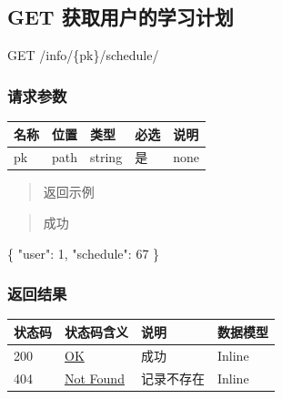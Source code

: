 \documentclass[
]{article}
\newenvironment{Shaded}{}{}
\newcommand{\DataTypeTok}[1]{\textcolor[rgb]{0.56,0.13,0.00}{#1}}
\newcommand{\DecValTok}[1]{\textcolor[rgb]{0.25,0.63,0.44}{#1}}
\newcommand{\FunctionTok}[1]{\textcolor[rgb]{0.02,0.16,0.49}{#1}}
\begin{document}
\hypertarget{get-ux83b7ux53d6ux7528ux6237ux7684ux5b66ux4e60ux8ba1ux5212}{%
\subsection{GET
获取用户的学习计划}\label{get-ux83b7ux53d6ux7528ux6237ux7684ux5b66ux4e60ux8ba1ux5212}}

GET /info/\{pk\}/schedule/

\hypertarget{ux8bf7ux6c42ux53c2ux6570-22}{%
\subsubsection{请求参数}\label{ux8bf7ux6c42ux53c2ux6570-22}}

\begin{longtable}[]{@{}lllll@{}}
\toprule
名称 & 位置 & 类型 & 必选 & 说明 \\
\midrule
\endhead
pk & path & string & 是 & none \\
\bottomrule
\end{longtable}

\begin{quote}
返回示例
\end{quote}

\begin{quote}
成功
\end{quote}

\begin{Shaded}
\begin{Highlighting}[]
\FunctionTok{\{}
  \DataTypeTok{"user"}\FunctionTok{:} \DecValTok{1}\FunctionTok{,}
  \DataTypeTok{"schedule"}\FunctionTok{:} \DecValTok{67}
\FunctionTok{\}}
\end{Highlighting}
\end{Shaded}

\hypertarget{ux8fd4ux56deux7ed3ux679c-23}{%
\subsubsection{返回结果}\label{ux8fd4ux56deux7ed3ux679c-23}}

\begin{longtable}[]{@{}llll@{}}
\toprule
状态码 & 状态码含义 & 说明 & 数据模型 \\
\midrule
\endhead
200 & \href{https://tools.ietf.org/html/rfc7231\#section-6.3.1}{OK} &
成功 & Inline \\
404 & \href{https://tools.ietf.org/html/rfc7231\#section-6.5.4}{Not
Found} & 记录不存在 & Inline \\
\bottomrule
\end{longtable}
\end{document}
